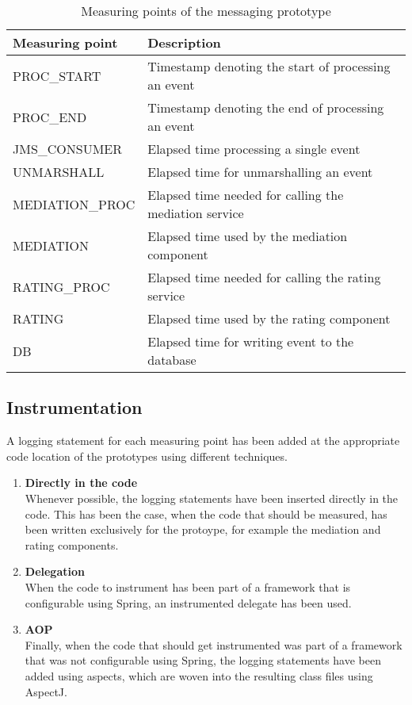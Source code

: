 \begin{table}[htpb]
	\centering
	\begin{tabularx}{\textwidth}{@{} l X @{}}
		\caption{Measuring points of the messaging prototype} \label{table:ch4_measuring_points_messaging}\\
		\toprule
		\bfseries Measuring point & \bfseries Description\\
		\midrule
		PROC\_START & Timestamp denoting the start of processing an event\\
		\midrule
		PROC\_END & Timestamp denoting the end of processing an event\\
		\midrule
		JMS\_CONSUMER & Elapsed time processing a single event\\
		\midrule
		UNMARSHALL & Elapsed time for unmarshalling an event\\
		\midrule
		MEDIATION\_PROC & Elapsed time needed for calling the mediation service\\
		\midrule
		MEDIATION & Elapsed time used by the mediation component\\
		\midrule
		RATING\_PROC & Elapsed time needed for calling the rating service\\
		\midrule
		RATING & Elapsed time used by the rating component\\
		\midrule
		DB & Elapsed time for writing event to the database\\
		\bottomrule 
	\end{tabularx}
\end{table}

\subsection{Instrumentation}
A logging statement for each measuring point has been added at the appropriate code location of the prototypes using different techniques.

\begin{enumerate}
	\item \textbf{Directly in the code}\\Whenever possible, the logging statements have been inserted directly in the code. This has been the case, when the code that should be measured, has been written exclusively for the protoype, for example the mediation and rating components.
	\item \textbf{Delegation}\\When the code to instrument has been part of a framework that is configurable using Spring, an instrumented delegate has been used.
	\item \textbf{AOP}\\Finally, when the code that should get instrumented was part of a framework that was not configurable using Spring, the logging statements have been added using aspects, which are woven into the resulting class files using AspectJ.
\end{enumerate}

